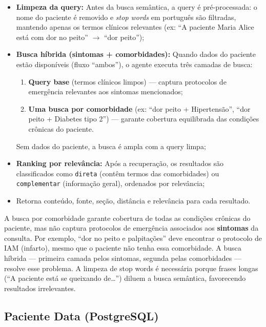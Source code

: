 \begin{itemize}
    \item \textbf{Limpeza da query:} Antes da busca semântica, a query é pré-processada: o nome do paciente é removido e \textit{stop words} em português são filtradas, mantendo apenas os termos clínicos relevantes (ex: ``A paciente Maria Alice está com dor no peito'' $\rightarrow$ ``dor peito'');
    \item \textbf{Busca híbrida (sintomas + comorbidades):} Quando dados do paciente estão disponíveis (fluxo ``ambos''), o agente executa três camadas de busca:
    \begin{enumerate}
        \item \textbf{Query base} (termos clínicos limpos) --- captura protocolos de emergência relevantes aos sintomas mencionados;
        \item \textbf{Uma busca por comorbidade} (ex: ``dor peito + Hipertensão'', ``dor peito + Diabetes tipo 2'') --- garante cobertura equilibrada das condições crônicas do paciente.
    \end{enumerate}
    Sem dados do paciente, a busca é ampla com a query limpa;
    \item \textbf{Ranking por relevância:} Após a recuperação, os resultados são classificados como \texttt{direta} (contêm termos das comorbidades) ou \texttt{complementar} (informação geral), ordenados por relevância;
    \item Retorna conteúdo, fonte, seção, distância e relevância para cada resultado.
\end{itemize}

\begin{infobox}
A busca por comorbidade garante cobertura de todas as condições crônicas do paciente, mas não captura protocolos de emergência associados aos \textbf{sintomas} da consulta. Por exemplo, ``dor no peito e palpitações'' deve encontrar o protocolo de IAM (infarto), mesmo que o paciente não tenha essa comorbidade. A busca híbrida --- primeira camada pelos sintomas, segunda pelas comorbidades --- resolve esse problema. A limpeza de stop words é necessária porque frases longas (``A paciente está se queixando de\ldots'') diluem a busca semântica, favorecendo resultados irrelevantes.
\end{infobox}

\subsection{Paciente Data (PostgreSQL)}

